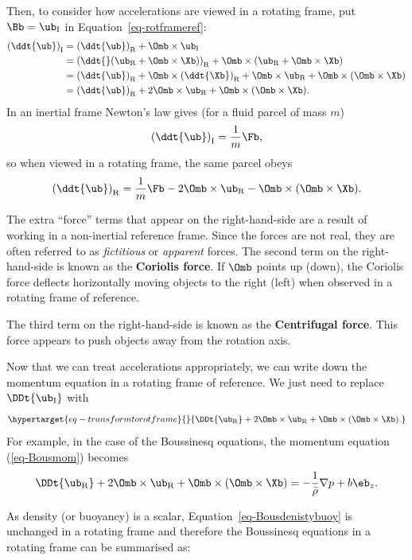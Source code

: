 \documentclass[
  letterpaper,
  twocolumn,
  landscape]{report}
\begin{document}
Then, to consider how accelerations are viewed in a rotating frame, put
\(\Bb=\ub_\mathrm{I}\) in Equation~\ref{eq-rotframeref}: \begin{align*}
\left( \ddt{\ub}\right)_\mathrm{I} & =  \left(\ddt{\ub}\right)_\mathrm{R}  + \Omb\times\ub_\mathrm{I}\\
& = \left(\ddt{}(\ub_\mathrm{R}+  \Omb\times\Xb)\right)_\mathrm{R} + \Omb\times(\ub_\mathrm{R}+  \Omb\times\Xb)\\
& = \left(\ddt{\ub}\right)_\mathrm{R}+  \Omb\times\left(\ddt{\Xb}\right)_\mathrm{R} + \Omb\times\ub_\mathrm{R}+ \Omb\times(\Omb\times\Xb)\\
& = \left(\ddt{\ub}\right)_\mathrm{R}+  2\Omb\times\ub_\mathrm{R} + \Omb\times(\Omb\times\Xb).
\end{align*} In an inertial frame Newton's law gives (for a fluid parcel
of mass \(m\)) \[
\left( \ddt{\ub}\right)_\mathrm{I} = \frac{1}{m}\Fb,
\] so when viewed in a rotating frame, the same parcel obeys \[
\left( \ddt{\ub}\right)_\mathrm{R} = \frac{1}{m}\Fb - 2\Omb\times\ub_\mathrm{R} - \Omb\times(\Omb\times\Xb).
\]

The extra ``force'' terms that appear on the right-hand-side are a
result of working in a non-inertial reference frame. Since the forces
are not real, they are often referred to as \emph{fictitious} or
\emph{apparent} forces. The second term on the right-hand-side is known
as the \textbf{Coriolis force}. If \(\Omb\) points up (down), the
Coriolis force deflects horizontally moving objects to the right (left)
when observed in a rotating frame of reference.

The third term on the right-hand-side is known as the
\textbf{Centrifugal force}. This force appears to push objects away from
the rotation axis.

Now that we can treat accelerations appropriately, we can write down the
momentum equation in a rotating frame of reference. We just need to
replace \(\DDt{\ub_\mathrm{I}}\) with
\begin{equation}\protect\hypertarget{eq-transformtorotframe}{}{
\DDt{\ub_\mathrm{R}} + 2\Omb \times\ub_\mathrm{R} + \Omb\times(\Omb \times \Xb).
}\label{eq-transformtorotframe}\end{equation} For example, in the case
of the Boussinesq equations, the momentum equation (\ref{eq-Bousmom})
becomes \[
\DDt{\ub_\mathrm{R}}  +2\Omb\times\ub_\mathrm{R} +\Omb\times(\Omb \times \Xb) = -\frac{1}{\bar\rho}\nabla p +b\eb_z.
\]

As density (or buoyancy) is a scalar, Equation~\ref{eq-Bousdenistybuoy}
is unchanged in a rotating frame and therefore the Boussinesq equations
in a rotating frame can be summarised as:
\end{document}
